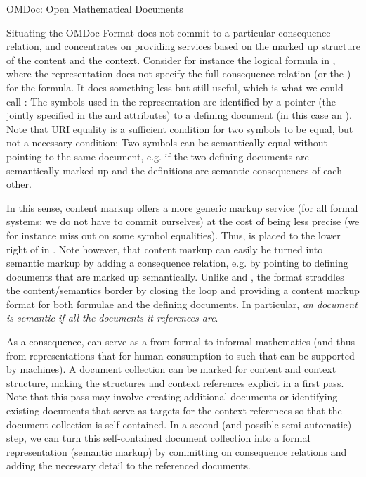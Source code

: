 \begin{tchapter}[id=omdoc-markup,short=Open Mathematical Documents]{OMDoc: Open Mathematical Documents}
\begin{tsection}[id=situating]{Situating the OMDoc Format}
{} does not commit to a particular consequence relation, and
concentrates on providing services based on the marked up structure of the content and the
context.  Consider for instance the logical formula in {}, where the
{\openmath} representation does not specify the full consequence relation (or the
{}) for the formula. It does something less but still useful,
which is what we could call {}: The symbols used in the
representation are identified by a pointer (the {} jointly specified in the
{} and {} attributes) to a
defining document (in this case an {\openmath} {}). Note that
URI equality is a sufficient condition for two symbols to be equal, but not a necessary
condition: Two symbols can be semantically equal without pointing to the same document,
e.g.  if the two defining documents are semantically marked up and the definitions are
semantic consequences of each other.

In this sense, content markup offers a more generic markup service (for all formal
systems; we do not have to commit ourselves) at the cost of being less precise (we for
instance miss out on some symbol equalities). Thus, {} is placed
to the lower right of {} in {}.  Note
however, that content markup can easily be turned into semantic markup by adding a
consequence relation, e.g. by pointing to defining documents that are marked up
semantically.  Unlike {\openmath} and {\cmathml}, the {\omdoc} format straddles the
content/semantics border by closing the loop and providing a content markup format for
both formulae and the defining documents. In particular, {\emph{an {\omdoc} document is
    semantic if all the documents it references are}}.

As a consequence, {\omdoc} can serve as a {} from formal to
informal mathematics (and thus from representations that for human consumption to such
that can be supported by machines). A document collection can be marked for content and
context structure, making the structures and context references explicit in a first
pass. Note that this pass may involve creating additional documents or identifying
existing documents that serve as targets for the context references so that the document
collection is self-contained.  In a second (and possible semi-automatic) step, we can turn
this self-contained document collection into a formal representation (semantic markup) by
committing on consequence relations and adding the necessary detail to the referenced
documents.
\end{tsection}


\end{tchapter}
